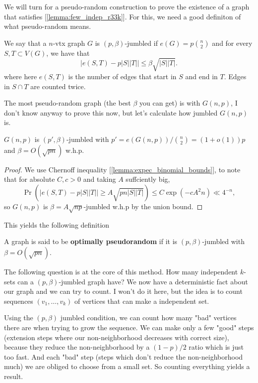 We will turn for a pseudo-random construction to prove the existence
of a graph that satisfies [\ref{lemma:few_indep_r33k}].
For this, we need a good definiton of what pseudo-random means.
\begin{definition}
	We say that a $n$-vtx graph $G$ is $(p,\beta)$-jumbled if $e(G) =
	p\binom{n}{2}$ and for every $S,T \subset V(G)$, we have that
	\[
		|e(S,T) - p|S||T|| \leq \beta\sqrt{|S||T|}.
	\]
	where here $e(S,T)$ is the number of edges that start in $S$ and end
	in $T$. Edges in $S \cap T$ are counted twice.
\end{definition}

The most pseudo-random graph (the best $\beta$ you can get) is with
$G(n,p)$, I don't know anyway to prove this now,
but let's calculate how jumbled $G(n,p)$ is.

\begin{theorem}
	$G(n,p)$ is $(p',\beta)$-jumbled with $p' = e(G(n,p))/\binom{n}{2} =
	(1 + o(1))p$ and $\beta = O(\sqrt{pn})$ w.h.p.
\end{theorem}
\begin{proof}
	We use Chernoff inequality [\ref{lemma:expec_binomial_bounds}], to
	note that for absolute $C,c > 0$ and taking $A$ suffciently big,
	\[
		\Pr( |e(S,T) - p|S||T|| \geq A\sqrt{pn|S||T|}) \leq C\exp(-cA^2n) \ll 4^{-n},
	\]
	so $G(n,p)$ is $\beta = A\sqrt{np}$-jumbled w.h.p by the union bound.
\end{proof}

This yields the following definition
\begin{definition}
	A graph is said to be \textbf{optimally pseudorandom} if it is
	$(p,\beta)$-jumbled with $\beta = O(\sqrt{pn})$.
\end{definition}

The following question is at the core of this method. How many
independent $k$-sets can a $(p,\beta)$-jumbled graph have? We now have
a deterministic fact about our graph and we can try to count. I won't
do it here, but the idea is to count sequences $(v_1, \dots, v_k)$
of vertices that can make a independent set.

Using the $(p,\beta)$
jumbled condition, we can count how many "bad" vertices there are
when trying to grow the sequence. We can make only a few
"good" steps (extension steps where our non-neighborhood decreases
with correct size),
because they reduce the non-neighborhood by a $(1-p)/2$ ratio which is just too
fast. And each "bad" step  (steps which don't reduce the non-neighborhood much)
we are obliged to choose from a small set. So counting
everything yields a result.

